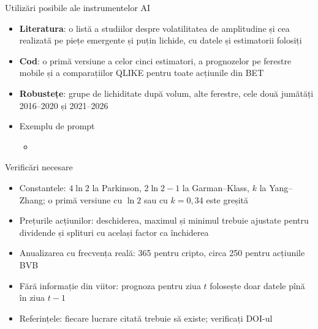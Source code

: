 \begin{frame}{Utilizări posibile ale instrumentelor AI}
\itemsize{\small}
\begin{itemize}
    \item \textbf{Literatura}: o listă a studiilor despre volatilitatea de amplitudine și cea realizată pe piețe emergente și puțin lichide, cu datele și estimatorii folosiți
    \item \textbf{Cod}: o primă versiune a celor cinci estimatori, a prognozelor pe ferestre mobile și a comparațiilor QLIKE pentru toate acțiunile din BET
    \item \textbf{Robustețe}: grupe de lichiditate după volum, alte ferestre, cele două jumătăți 2016--2020 și 2021--2026
    \item Exemplu de prompt
    \begin{itemize}
        \item {}
    \end{itemize}
\end{itemize}
\end{frame}

\begin{frame}{Verificări necesare}
\itemsize{\small}
\begin{itemize}
    \item Constantele: $4\ln 2$ la Parkinson, $2\ln 2 - 1$ la Garman--Klass, $k$ la Yang--Zhang; o primă versiune cu $\ln 2$ sau cu $k = 0{,}34$ este greșită
    \item Prețurile acțiunilor: deschiderea, maximul și minimul trebuie ajustate pentru dividende și splituri cu același factor ca închiderea
    \item Anualizarea cu frecvența reală: 365 pentru cripto, circa 250 pentru acțiunile BVB
    \item Fără informație din viitor: prognoza pentru ziua $t$ folosește doar datele pînă în ziua $t-1$
    \item Referințele: fiecare lucrare citată trebuie să existe; verificați DOI-ul
\end{itemize}
\end{frame}

